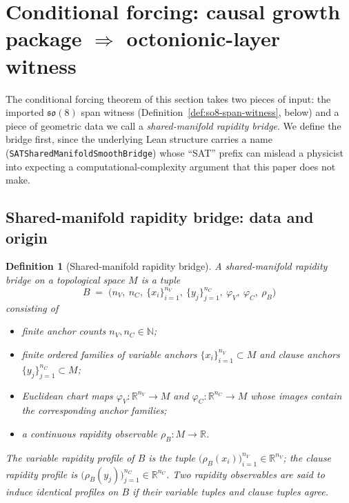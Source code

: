 \documentclass[11pt]{amsart}
\newtheorem{definition}[theorem]{Definition}
\begin{document}
\section{Conditional forcing: causal growth package \texorpdfstring{$\Rightarrow$}{=>} octonionic-layer witness}
\label{sec:conditional-forcing}

The conditional forcing theorem of this section takes two pieces of input: the imported \(\mathfrak{so}(8)\) span witness (Definition~\ref{def:so8-span-witness}, below) and a piece of geometric data we call a \emph{shared-manifold rapidity bridge}. We define the bridge first, since the underlying Lean structure carries a name (\texttt{SATSharedManifoldSmoothBridge}) whose ``SAT'' prefix can mislead a physicist into expecting a computational-complexity argument that this paper does not make.

\subsection{Shared-manifold rapidity bridge: data and origin}
\label{subsec:rapidity-bridge}

\begin{definition}[Shared-manifold rapidity bridge]
\label{def:rapidity-bridge}
A \emph{shared-manifold rapidity bridge} on a topological space \(M\) is a tuple
\[
B \;=\; \bigl(n_V,\ n_C,\ \{x_i\}_{i=1}^{n_V},\ \{y_j\}_{j=1}^{n_C},\ \varphi_V,\ \varphi_C,\ \rho_B\bigr)
\]
consisting of
\begin{itemize}
  \item finite anchor counts \(n_V,n_C\in\mathbb{N}\);
  \item finite ordered families of \emph{variable anchors} \(\{x_i\}_{i=1}^{n_V}\subset M\) and \emph{clause anchors} \(\{y_j\}_{j=1}^{n_C}\subset M\);
  \item Euclidean chart maps \(\varphi_V:\mathbb{R}^{n_V}\to M\) and \(\varphi_C:\mathbb{R}^{n_C}\to M\) whose images contain the corresponding anchor families;
  \item a continuous rapidity observable \(\rho_B:M\to\mathbb{R}\).
\end{itemize}
The \emph{variable rapidity profile} of \(B\) is the tuple \(\bigl(\rho_B(x_i)\bigr)_{i=1}^{n_V}\in\mathbb{R}^{n_V}\); the \emph{clause rapidity profile} is \(\bigl(\rho_B(y_j)\bigr)_{j=1}^{n_C}\in\mathbb{R}^{n_C}\). Two rapidity observables are said to \emph{induce identical profiles} on \(B\) if their variable tuples and clause tuples agree.
\end{definition}
\end{document}

